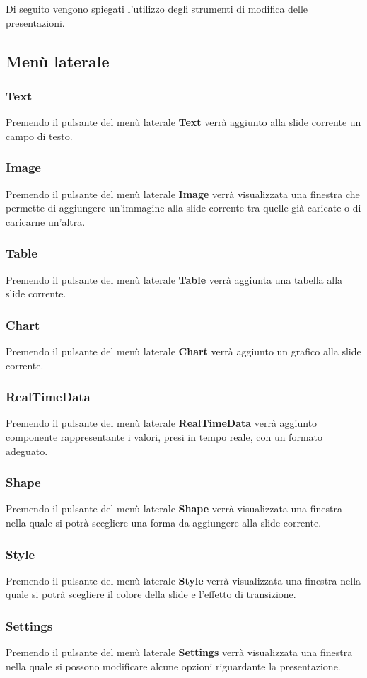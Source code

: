 \noindent
Di seguito vengono spiegati l'utilizzo degli strumenti di modifica delle presentazioni.

\subsection{Menù laterale}
\subsubsection{Text}
Premendo il pulsante del menù laterale \textbf{Text} verrà aggiunto alla slide corrente un campo di testo.
\subsubsection{Image}
Premendo il pulsante del menù laterale \textbf{Image} verrà visualizzata una finestra che permette di aggiungere un'immagine alla slide corrente tra quelle già caricate o di caricarne un'altra.
\subsubsection{Table}
Premendo il pulsante del menù laterale \textbf{Table} verrà aggiunta una tabella alla slide corrente.
\subsubsection{Chart}
Premendo il pulsante del menù laterale \textbf{Chart} verrà aggiunto un grafico alla slide corrente.
\subsubsection{RealTimeData}
Premendo il pulsante del menù laterale \textbf{RealTimeData} verrà aggiunto componente rappresentante i valori, presi in tempo reale, con un formato adeguato.
\subsubsection{Shape}
Premendo il pulsante del menù laterale \textbf{Shape} verrà visualizzata una finestra nella quale si potrà scegliere una forma da aggiungere alla slide corrente.
\subsubsection{Style}
Premendo il pulsante del menù laterale \textbf{Style} verrà 
visualizzata una finestra nella quale si potrà scegliere il colore della slide e l'effetto di transizione.
\subsubsection{Settings}
Premendo il pulsante del menù laterale \textbf{Settings} verrà visualizzata una finestra nella quale si possono modificare alcune opzioni riguardante la presentazione.

